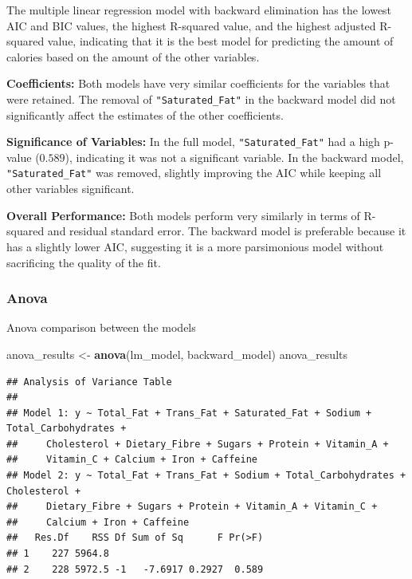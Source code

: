 \documentclass[
]{article}
\newenvironment{Shaded}{\begin{snugshade}}{\end{snugshade}}
\newcommand{\FunctionTok}[1]{\textcolor[rgb]{0.13,0.29,0.53}{\textbf{#1}}}
\newcommand{\NormalTok}[1]{#1}
\newcommand{\OtherTok}[1]{\textcolor[rgb]{0.56,0.35,0.01}{#1}}
\begin{document}
The multiple linear regression model with backward elimination has the
lowest AIC and BIC values, the highest R-squared value, and the highest
adjusted R-squared value, indicating that it is the best model for
predicting the amount of calories based on the amount of the other
variables.

\textbf{Coefficients:} Both models have very similar coefficients for
the variables that were retained. The removal of
\texttt{"Saturated\_Fat"} in the backward model did not significantly
affect the estimates of the other coefficients.

\textbf{Significance of Variables:} In the full model,
\texttt{"Saturated\_Fat"} had a high p-value (\(0.589\)), indicating it
was not a significant variable. In the backward model,
\texttt{"Saturated\_Fat"} was removed, slightly improving the AIC while
keeping all other variables significant.

\textbf{Overall Performance:} Both models perform very similarly in
terms of R-squared and residual standard error. The backward model is
preferable because it has a slightly lower AIC, suggesting it is a more
parsimonious model without sacrificing the quality of the fit.

\subsubsection{Anova}\label{anova}

Anova comparison between the models

\begin{Shaded}
\begin{Highlighting}[]
\NormalTok{anova\_results }\OtherTok{\textless{}{-}} \FunctionTok{anova}\NormalTok{(lm\_model, backward\_model)}
\NormalTok{anova\_results}
\end{Highlighting}
\end{Shaded}

\begin{verbatim}
## Analysis of Variance Table
## 
## Model 1: y ~ Total_Fat + Trans_Fat + Saturated_Fat + Sodium + Total_Carbohydrates + 
##     Cholesterol + Dietary_Fibre + Sugars + Protein + Vitamin_A + 
##     Vitamin_C + Calcium + Iron + Caffeine
## Model 2: y ~ Total_Fat + Trans_Fat + Sodium + Total_Carbohydrates + Cholesterol + 
##     Dietary_Fibre + Sugars + Protein + Vitamin_A + Vitamin_C + 
##     Calcium + Iron + Caffeine
##   Res.Df    RSS Df Sum of Sq      F Pr(>F)
## 1    227 5964.8                           
## 2    228 5972.5 -1   -7.6917 0.2927  0.589
\end{verbatim}
\end{document}
